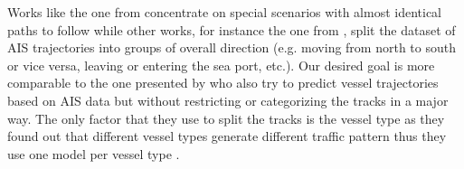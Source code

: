 Works like the one from \cite{martinsen2018curved} concentrate on special scenarios with almost identical paths to follow while other works, for instance the one from \cite{edgardo}, split the dataset of AIS trajectories into groups of overall direction (e.g. moving from north to south or vice versa, leaving or entering the sea port, etc.). Our desired goal is more comparable to the one presented by \cite{venskus2021unsupervised} who also try to predict vessel trajectories based on AIS data but without restricting or categorizing the tracks in a major way. The only factor that they use to split the tracks is the vessel type as they found out that different vessel types generate different traffic pattern thus they use one model per vessel type \cite[p.~729]{venskus2021unsupervised}.